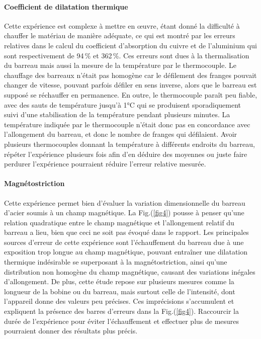\documentclass[a4paper, 12pt,oneside]{article}
\begin{document}
\paragraph{Coefficient de dilatation thermique}

Cette expérience est complexe à mettre en œuvre, étant donné la difficulté à chauffer le matériau de manière adéquate, ce qui est montré par les erreurs relatives dans le calcul du coefficient d'absorption du cuivre et de l'aluminium qui sont respectivement de 94\,\% et 362\,\%. Ces erreurs sont dues à la thermalisation du barreau mais aussi la mesure de la température par le thermocouple. Le chauffage des barreaux n'était pas homogène car le défilement des franges pouvait changer de vitesse, pouvant parfois défiler en sens inverse, alors que le barreau est supposé se réchauffer en permanence. En outre, le thermocouple paraît peu fiable, avec des sauts de température jusqu'à 1°C qui se produisent sporadiquement suivi d'une stabilisation de la température pendant plusieurs minutes. La température indiquée par le thermocouple n'était donc pas en concordance avec l'allongement du barreau, et donc le nombre de franges qui défilaient. Avoir plusieurs thermocouples donnant la température à différents endroits du barreau, répéter l'expérience plusieurs fois afin d'en déduire des moyennes ou juste faire perdurer l'expérience pourraient réduire l'erreur relative mesurée.

\paragraph{Magnétostriction}

Cette expérience permet bien d'évaluer la variation dimensionnelle du barreau d’acier soumis à un champ magnétique. La Fig.(\ref{fig4}) pousse à penser qu'une relation quadratique entre le champ magnétique et l'allongement relatif du barreau a lieu, bien que ceci ne soit pas évoqué dans le rapport. Les principales sources d'erreur de cette expérience sont l'échauffement du barreau due à une exposition trop longue au champ magnétique, pouvant entraîner une dilatation thermique indésirable se superposant à la magnétostriction, ainsi qu'une distribution non homogène du champ magnétique, causant des variations inégales d'allongement. De plus, cette étude repose sur plusieurs mesures comme la longueur de la bobine ou du barreau, mais surtout celle de l'intensité, dont l'appareil donne des valeurs peu précises. Ces imprécisions s'accumulent et expliquent la présence des barres d'erreurs dans la Fig.(\ref{fig4}). Raccourcir la durée de l'expérience pour éviter l'échauffement et effectuer plus de mesures pourraient donner des résultats plus précis.
\end{document}
